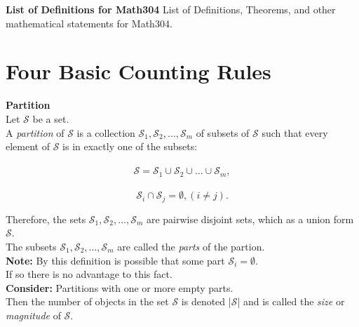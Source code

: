 \documentclass{article}
\begin{document}
\begin{tcolorbox}
    \textbf{\large List of Definitions for Math304}
List of Definitions, Theorems, and other mathematical statements for Math304. \\
\end{tcolorbox}
\bigskip



\section*{Four Basic Counting Rules}



\begin{tcolorbox}
\textbf{Partition} \\
Let $\mathcal{S}$ be a set. 
\\
A \textit{partition} of $\mathcal{S}$ is a collection $\mathcal{S}_{1},\mathcal{S}_{2}, …, \mathcal{S}_{m}$ of subsets of $\mathcal{S}$ such that every element of $\mathcal{S}$ is in exactly one of the subsets:
\\ \\

$$\mathcal{S} = \mathcal{S}_{1} \cup \mathcal{S}_{2} \cup … \cup \mathcal{S}_{m},$$ \\
$$\mathcal{S}_{i} \cap \mathcal{S}_{j} = \emptyset, (i \neq j).$$


Therefore, the sets $\mathcal{S}_1, \mathcal{S}_2, …, \mathcal{S}_m$ are pairwise disjoint sets, which as a union form $\mathcal{S}$. 
\\
The subsets $\mathcal{S}_1, \mathcal{S}_2, …, \mathcal{S}_m$ are called the \textit{parts} of the partion. 
\\
\textbf{Note: } By this definition is possible that some part $\mathcal{S}_{i} = \emptyset$. \\
If so there is no advantage to this fact. 
\\
\textbf{Consider: } Partitions with one or more empty parts. 
\\ 
Then the number of objects in the set $\mathcal{S}$ is denoted |$\mathcal{S}$| and is called the \textit{size} or \textit{magnitude} of $\mathcal{S}$. 
\\ \\
\end{tcolorbox}



\end{document}

